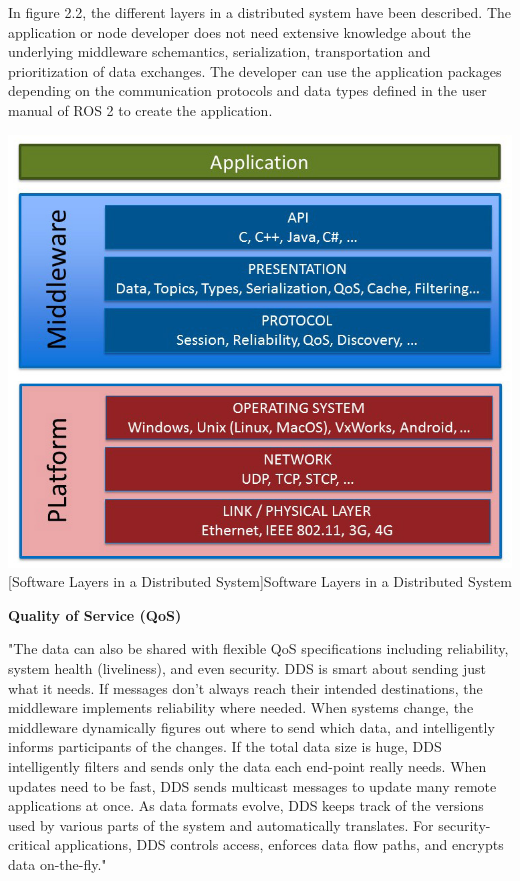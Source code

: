 \documentclass[%
xelatex,
	oneside,		%
	12pt,			%
	parskip=half,	%
	abstracton,
	chapterprefix=true%
    appendixprefix=true]
{scrbook}
\begin{document}
	\vspace*{0.25cm}
In figure 2.2, the different layers in a distributed system have been described. The application or node developer does not need extensive knowledge about the underlying middleware schemantics, serialization, transportation and prioritization of data exchanges. The developer can use the application packages depending on the communication protocols and data types defined in the user manual of ROS 2 to create the application.	
\begin{center}
\includegraphics[scale=0.4]{fig/DDS.jpg}
[Software Layers in a Distributed System]{Software Layers in a Distributed System \cite{DDS}}
\label{fig:DDS}
\end{center}

\vspace*{0.5cm}
	
	{\bfseries Quality of Service (QoS)}
	
	
	\vspace*{0.5cm}
	"The data can also be shared with flexible QoS specifications including reliability, system health (liveliness), and even security. DDS is smart about sending just what it needs. If messages don’t always reach their intended destinations, the middleware implements reliability where needed. When systems change, the middleware dynamically figures out where to send which data, and intelligently informs participants of the changes. If the total data size is huge, DDS intelligently filters and sends only the data each end-point really needs. When updates need to be fast, DDS sends multicast messages to update many remote applications at once. As data formats evolve, DDS keeps track of the versions used by various parts of the system and automatically translates. For security-critical applications, DDS controls access, enforces data flow paths, and encrypts data on-the-fly." \cite{DDS}
	
\end{document}
